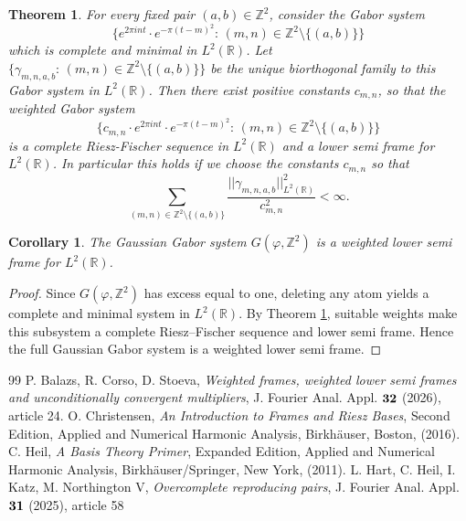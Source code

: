 \documentclass[10pt,a4paper]{amsart}
\newtheorem{theorem}{Theorem}[section]
\newtheorem{corollary}{Corollary}[section]
\begin{document}
\begin{theorem}\label{weightedlower}
For every fixed pair $(a,b)\in\mathbb{Z}^2$, consider the Gabor system
\[
\{e^{2\pi int}\cdot e^{-\pi(t-m)^2}:\, (m,n)\in \mathbb{Z}^2\setminus\{(a,b)\}\}
\]
which is complete and minimal in $L^2 (\mathbb{R})$. Let $\{\gamma_{m,n,a,b}:\, (m,n)\in \mathbb{Z}^2\setminus\{(a,b)\}\}$ be the unique biorthogonal family to this Gabor system in $L^2(\mathbb{R})$. Then
there exist positive constants $c_{m,n}$, so that the weighted Gabor system
\[
\{c_{m,n}\cdot  e^{2\pi int}\cdot e^{-\pi(t-m)^2}:\, (m,n)\in \mathbb{Z}^2\setminus\{(a,b)\}\}
\]
is a complete Riesz-Fischer sequence in $L^2 (\mathbb{R})$ and a lower semi frame for $L^2(\mathbb{R})$.
In particular this holds if we choose the constants $c_{m,n}$ so that
\[
\sum_{(m,n)\in \mathbb{Z}^2\setminus\{(a,b)\}}\frac{||\gamma_{m,n,a,b}||_{L^2(\mathbb{R})}^2}{c_{m,n}^2}<\infty.
\]
\end{theorem}


\begin{corollary}\label{GaborWLF}
The Gaussian Gabor system $G(\varphi, \mathbb{Z}^2)$ is a weighted lower semi frame for $L^2 (\mathbb{R})$.
\end{corollary}

\begin{proof}
Since $G(\varphi, \mathbb{Z}^2)$ has excess equal to one, deleting any atom yields a complete and minimal system in $L^2 (\mathbb{R})$.
By Theorem \ref{weightedlower}, suitable weights make this subsystem a complete Riesz–Fischer sequence and lower semi frame. Hence the full Gaussian Gabor system is a weighted lower semi frame.
\end{proof}


\begin{thebibliography}{99}
 P. Balazs, R. Corso, D. Stoeva, \textit{Weighted frames, weighted lower semi frames and unconditionally convergent multipliers}, J. Fourier Anal. Appl. $\bf 32$ (2026), article 24.
 O. Christensen, \textit{An Introduction to Frames and Riesz Bases}, Second Edition, Applied and Numerical Harmonic Analysis, Birkh\"{a}user, Boston, (2016).
 C. Heil, \textit{A Basis Theory Primer}, Expanded Edition, Applied and Numerical Harmonic Analysis, Birkh\"{a}user/Springer, New York, (2011).
 L. Hart, C. Heil, I. Katz, M. Northington V, \textit{Overcomplete reproducing pairs}, J. Fourier Anal. Appl. $\bf 31$ (2025), article 58
\end{thebibliography}
\end{document}
